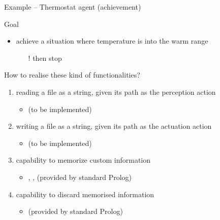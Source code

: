 \documentclass[presentation]{beamer}\mode<presentation>{\usetheme{AMSBolognaFC}}
\begin{document}
\begin{frame}[allowframebreaks]{Example -- Thermostat agent (achievement)}
\label{slide:achievement}


    \framebreak

    \begin{exampleblock}{Goal}
        \begin{itemize}
            \item \alert{achieve} a situation where temperature is into the \alert{warm} range
            \begin{itemize}
                \item[!] then stop
            \end{itemize}
        \end{itemize}
    \end{exampleblock}

    \begin{block}{How to realise these kind of functionalities?}
        \begin{enumerate}    
            \item reading a file as a string, given its path as the perception action
            \begin{itemize}
                \item {} \alert{(to be implemented)}
            \end{itemize}

            \item writing a file as a string, given its path as the actuation action
            \begin{itemize}
                \item {} \alert{(to be implemented)}
            \end{itemize}

            \item capability to memorize custom information
            \begin{itemize}
                \item {}, ,  \alert{(provided by standard Prolog)}
            \end{itemize}

            \item capability to discard memorised information
            \begin{itemize}
                \item {} \alert{(provided by standard Prolog)}
            \end{itemize}
        \end{enumerate}
    \end{block}
\end{frame}
\end{document}
